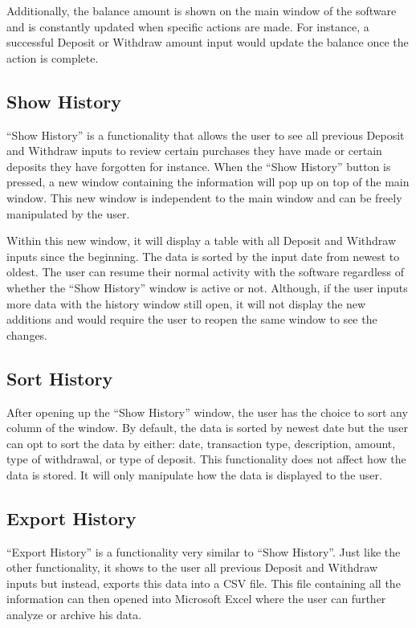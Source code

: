 \documentclass[12pt]{article}
\begin{document}
Additionally, the balance amount is shown on the main window of the software and is constantly updated when specific actions are made. For instance, a successful Deposit or Withdraw amount input would update the balance once the action is complete. 


\subsection{Show History} 
“Show History” is a functionality that allows the user to see all previous Deposit and Withdraw inputs to review certain purchases they have made or certain deposits they have forgotten for instance. When the “Show History” button is pressed, a new window containing the information will pop up on top of the main window. This new window is independent to the main window and can be freely manipulated by the user. 

Within this new window, it will display a table with all Deposit and Withdraw inputs since the beginning. The data is sorted by the input date from newest to oldest. The user can resume their normal activity with the software regardless of whether the “Show History” window is active or not. Although, if the user inputs more data with the history window still open, it will not display the new additions and would require the user to reopen the same window to see the changes.

\subsection{Sort History} 
After opening up the “Show History” window, the user has the choice to sort any column of the window. By default, the data is sorted by newest date but the user can opt to sort the data by either: date, transaction type, description, amount, type of withdrawal, or type of deposit. This functionality does not affect how the data is stored. It will only manipulate how the data is displayed to the user.  

\subsection{Export History} 
“Export History” is a functionality very similar to “Show History”. Just like the other functionality, it shows to the user all previous Deposit and Withdraw inputs but instead, exports this data into a CSV file. This file containing all the information can then opened into Microsoft Excel where the user can further analyze or archive his data. 
\end{document}
